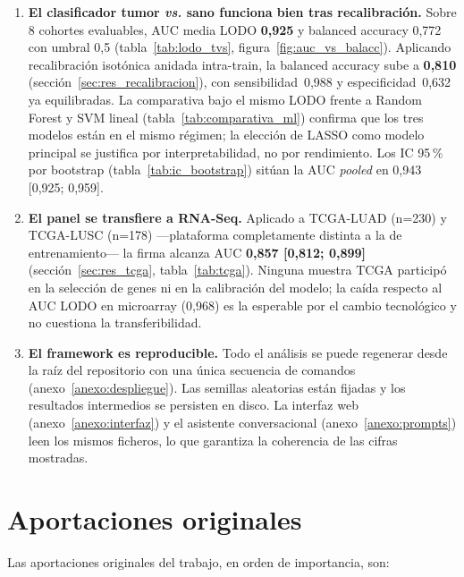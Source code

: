 \begin{enumerate}
  \item \textbf{El clasificador tumor \emph{vs.} sano funciona bien tras
  recalibración.} Sobre 8 cohortes evaluables, AUC media LODO
  \textbf{0,925} y balanced accuracy 0,772 con umbral 0,5
  (tabla~\ref{tab:lodo_tvs}, figura~\ref{fig:auc_vs_balacc}). Aplicando
  recalibración isotónica anidada intra-train, la balanced accuracy sube a
  \textbf{0,810} (sección~\ref{sec:res_recalibracion}), con
  sensibilidad~0,988 y especificidad~0,632 ya equilibradas. La comparativa
  bajo el mismo LODO frente a Random Forest y SVM lineal
  (tabla~\ref{tab:comparativa_ml}) confirma que los tres modelos están en
  el mismo régimen; la elección de LASSO como modelo principal se
  justifica por interpretabilidad, no por rendimiento. Los IC 95\,\% por
  bootstrap (tabla~\ref{tab:ic_bootstrap}) sitúan la AUC
  \emph{pooled} en 0,943 [0,925; 0,959].

  \item \textbf{El panel se transfiere a RNA-Seq.} Aplicado a TCGA-LUAD
  (n=230) y TCGA-LUSC (n=178) —plataforma completamente distinta a la de
  entrenamiento— la firma alcanza AUC \textbf{0,857 [0,812; 0,899]}
  (sección~\ref{sec:res_tcga}, tabla~\ref{tab:tcga}). Ninguna muestra
  TCGA participó en la selección de genes ni en la calibración del
  modelo; la caída respecto al AUC LODO en microarray (0,968) es la
  esperable por el cambio tecnológico y no cuestiona la transferibilidad.

  \item \textbf{El framework es reproducible.} Todo el análisis se
  puede regenerar desde la raíz del repositorio con una única secuencia
  de comandos (anexo~\ref{anexo:despliegue}). Las semillas aleatorias
  están fijadas y los resultados intermedios se persisten en disco. La
  interfaz web (anexo~\ref{anexo:interfaz}) y el asistente
  conversacional (anexo~\ref{anexo:prompts}) leen los mismos ficheros,
  lo que garantiza la coherencia de las cifras mostradas.
\end{enumerate}

\section{Aportaciones originales}
\label{sec:conc_aportaciones}

Las aportaciones originales del trabajo, en orden de importancia, son:


